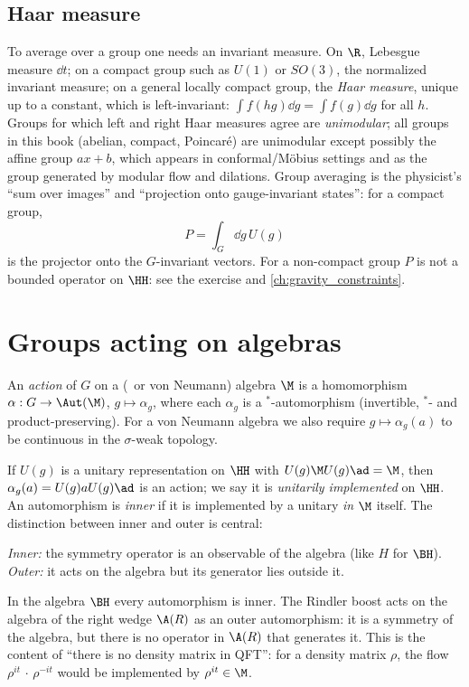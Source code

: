 \subsection*{Haar measure}
To average over a group one needs an invariant measure. On $\R$, Lebesgue measure $\dd t$; on a compact group such as $U(1)$ or $SO(3)$, the normalized invariant measure; on a general locally compact group, the \emph{Haar measure}, unique up to a constant, which is left-invariant: $\int f(hg)\dd g=\int f(g)\dd g$ for all $h$. Groups for which left and right Haar measures agree are \emph{unimodular}; all groups in this book (abelian, compact, Poincar\'e) are unimodular except possibly the affine group $ax+b$, which appears in conformal/Möbius settings and as the group generated by modular flow and dilations. Group averaging is the physicist's ``sum over images'' and ``projection onto gauge-invariant states'': for a compact group,
\begin{equation}
P=\int_G\dd g\,U(g)
\end{equation}
is the projector onto the $G$-invariant vectors. For a non-compact group $P$ is not a bounded operator on $\HH$: see the exercise and \cref{ch:gravity_constraints}.

\section{Groups acting on algebras}

\begin{definition}
An \emph{action} of $G$ on a (\cstar\ or von Neumann) algebra $\M$ is a homomorphism $\alpha:G\to\Aut(\M)$, $g\mapsto\alpha_g$, where each $\alpha_g$ is a $^*$-automorphism (invertible, $^*$- and product-preserving). For a von Neumann algebra we also require $g\mapsto\alpha_g(a)$ to be continuous in the $\sigma$-weak topology.
\end{definition}

If $U(g)$ is a unitary representation on $\HH$ with $U(g)\M U(g)\ad=\M$, then $\alpha_g(a)=U(g)aU(g)\ad$ is an action; we say it is \emph{unitarily implemented} on $\HH$. An automorphism is \emph{inner} if it is implemented by a unitary \emph{in} $\M$ itself. The distinction between inner and outer is central:

\begin{center}
\emph{Inner:} the symmetry operator is an observable of the algebra (like $H$ for $\BH$).\\
\emph{Outer:} it acts on the algebra but its generator lies outside it.
\end{center}
In the algebra $\BH$ every automorphism is inner. The Rindler boost acts on the algebra of the right wedge $\A(R)$ as an outer automorphism: it is a symmetry of the algebra, but there is no operator in $\A(R)$ that generates it. This is the content of ``there is no density matrix in QFT'': for a density matrix $\rho$, the flow $\rho^{it}\,\cdot\,\rho^{-it}$ would be implemented by $\rho^{it}\in\M$.

